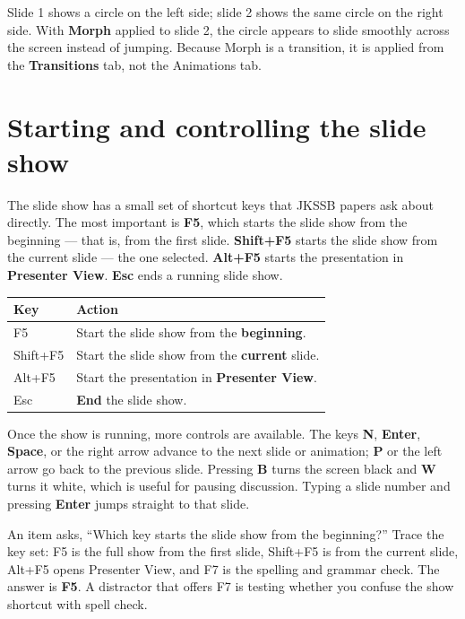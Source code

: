 \begin{example}
Slide 1 shows a circle on the left side; slide 2 shows the same circle on the
right side. With \textbf{Morph} applied to slide 2, the circle appears to
slide smoothly across the screen instead of jumping. Because Morph is a
transition, it is applied from the \textbf{Transitions} tab, not the Animations
tab.
\end{example}

\section{Starting and controlling the slide show}
The slide show has a small set of shortcut keys that JKSSB papers ask about
directly. The most important is \textbf{F5}, which starts the slide show from
the beginning --- that is, from the first slide. \textbf{Shift+F5} starts the
slide show from the current slide --- the one selected. \textbf{Alt+F5} starts
the presentation in \textbf{Presenter View}. \textbf{Esc} ends a running slide
show.

\begin{center}
\begin{tabular}{p{}p{}}
\toprule
\textbf{Key} & \textbf{Action} \\
\midrule
F5 & Start the slide show from the \textbf{beginning}. \\
Shift+F5 & Start the slide show from the \textbf{current} slide. \\
Alt+F5 & Start the presentation in \textbf{Presenter View}. \\
Esc & \textbf{End} the slide show. \\
\bottomrule
\end{tabular}
\end{center}

Once the show is running, more controls are available. The keys \textbf{N},
\textbf{Enter}, \textbf{Space}, or the right arrow advance to the next slide or
animation; \textbf{P} or the left arrow go back to the previous slide.
Pressing \textbf{B} turns the screen black and \textbf{W} turns it white, which
is useful for pausing discussion. Typing a slide number and pressing
\textbf{Enter} jumps straight to that slide.

\begin{example}
An item asks, ``Which key starts the slide show from the beginning?'' Trace
the key set: F5 is the full show from the first slide, Shift+F5 is from the
current slide, Alt+F5 opens Presenter View, and F7 is the spelling and grammar
check. The answer is \textbf{F5}. A distractor that offers F7 is testing
whether you confuse the show shortcut with spell check.
\end{example}


